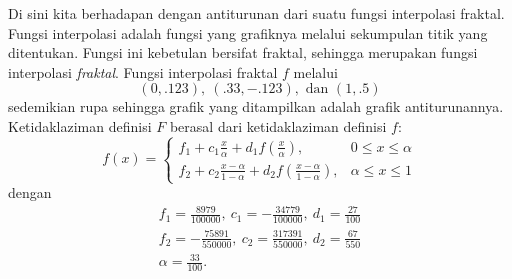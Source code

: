 Di sini kita berhadapan dengan antiturunan dari suatu fungsi interpolasi
fraktal. Fungsi interpolasi adalah fungsi yang grafiknya melalui sekumpulan
titik yang ditentukan. Fungsi ini kebetulan bersifat fraktal, sehingga
merupakan fungsi interpolasi \textit{fraktal}. Fungsi interpolasi
fraktal $f$ melalui
\begin{equation}
(0,.123),\ (.33,-.123),\mbox{ dan }(1,.5)\label{eq:interpolationPoints}
\end{equation}
sedemikian rupa sehingga grafik yang ditampilkan adalah grafik antiturunannya.
Ketidaklaziman definisi $F$ berasal dari ketidaklaziman definisi
$f$:
\[
f(x)=\begin{cases}
f_{1}+c_{1}\frac{x}{\alpha}+d_{1}f\left(\frac{x}{\alpha}\right), & 0\leq x\leq\alpha\\
f_{2}+c_{2}\frac{x-\alpha}{1-\alpha}+d_{2}f\left(\frac{x-\alpha}{1-\alpha}\right), & \alpha\leq x\leq1
\end{cases}
\]
dengan
\[
\begin{gathered}f_{1}=\frac{8979}{100000},\ c_{1}=-\frac{34779}{100000},\ d_{1}=\frac{27}{100}\\
f_{2}=-\frac{75891}{550000},\ c_{2}=\frac{317391}{550000},\ d_{2}=\frac{67}{550}\\
\alpha=\frac{33}{100}.
\end{gathered}
\]

